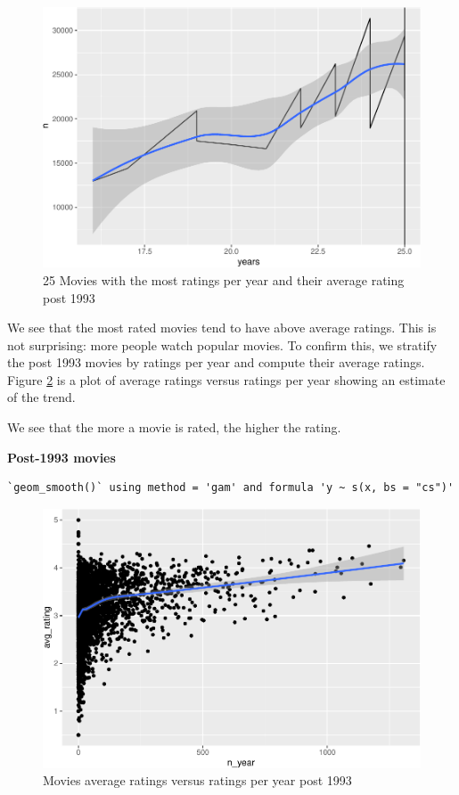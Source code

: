 \documentclass[
]{article}
\begin{document}
\begin{figure}
\centering
\includegraphics{figures/md_3-1.pdf}
\caption{25 Movies with the most ratings per year and their average
rating post
1993\label{fig:25_movies_avg_and_most_ratings_per_year_post_1993}}
\end{figure}

\newpage

We see that the most rated movies tend to have above average ratings.
This is not surprising: more people watch popular movies. To confirm
this, we stratify the post 1993 movies by ratings per year and compute
their average ratings. Figure
\ref{fig:movies_average_ratings_versus_ratings_per_year_post_1993} is a
plot of average ratings versus ratings per year showing an estimate of
the trend.

We see that the more a movie is rated, the higher the rating.

\textbf{Post-1993 movies}

\begin{verbatim}
`geom_smooth()` using method = 'gam' and formula 'y ~ s(x, bs = "cs")'
\end{verbatim}

\begin{figure}
\centering
\includegraphics{figures/md_4-1.pdf}
\caption{Movies average ratings versus ratings per year post
1993\label{fig:movies_average_ratings_versus_ratings_per_year_post_1993}}
\end{figure}
\end{document}
